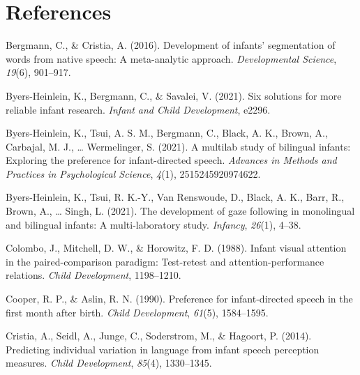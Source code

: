 \documentclass[
  english,
  man,floatsintext]{apa6}
\newlength{\cslhangindent}
\newlength{\cslentryspacingunit} %
\newenvironment{CSLReferences}[2] %
 {%
  \setlength{\parindent}{0pt}
  \ifodd #1
  \let\oldpar\par
  \def\par{\hangindent=\cslhangindent\oldpar}
  \fi
  \setlength{\parskip}{#2\cslentryspacingunit}
 }%
 {}
\begin{document}
\hypertarget{references}{%
\section{References}\label{references}}

\begingroup
\setlength{\parindent}{-0.5in}
\setlength{\leftskip}{0.5in}

\hypertarget{refs}{}
\begin{CSLReferences}{1}{0}
\leavevmode{}%
Bergmann, C., \& Cristia, A. (2016). Development of infants' segmentation of words from native speech: A meta-analytic approach. \emph{Developmental Science}, \emph{19}(6), 901--917.

\leavevmode{}%
Byers-Heinlein, K., Bergmann, C., \& Savalei, V. (2021). Six solutions for more reliable infant research. \emph{Infant and Child Development}, e2296.

\leavevmode{}%
Byers-Heinlein, K., Tsui, A. S. M., Bergmann, C., Black, A. K., Brown, A., Carbajal, M. J., \ldots{} Wermelinger, S. (2021). A multilab study of bilingual infants: Exploring the preference for infant-directed speech. \emph{Advances in Methods and Practices in Psychological Science}, \emph{4}(1), 2515245920974622.

\leavevmode{}%
Byers-Heinlein, K., Tsui, R. K.-Y., Van Renswoude, D., Black, A. K., Barr, R., Brown, A., \ldots{} Singh, L. (2021). The development of gaze following in monolingual and bilingual infants: A multi-laboratory study. \emph{Infancy}, \emph{26}(1), 4--38.

\leavevmode{}%
Colombo, J., Mitchell, D. W., \& Horowitz, F. D. (1988). Infant visual attention in the paired-comparison paradigm: Test-retest and attention-performance relations. \emph{Child Development}, 1198--1210.

\leavevmode{}%
Cooper, R. P., \& Aslin, R. N. (1990). Preference for infant-directed speech in the first month after birth. \emph{Child Development}, \emph{61}(5), 1584--1595.

\leavevmode{}%
Cristia, A., Seidl, A., Junge, C., Soderstrom, M., \& Hagoort, P. (2014). Predicting individual variation in language from infant speech perception measures. \emph{Child Development}, \emph{85}(4), 1330--1345.


\end{CSLReferences}
\end{document}
